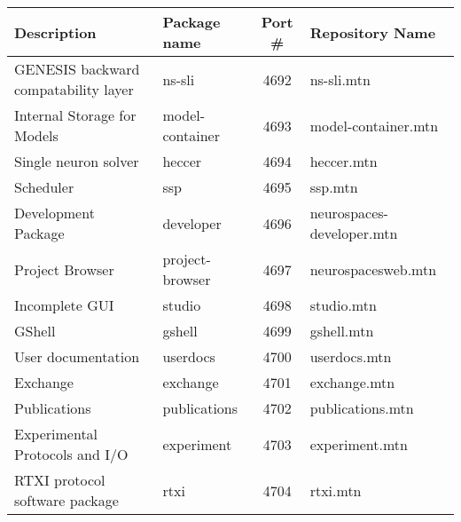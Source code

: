 \documentclass[12pt]{article}
\begin{document}
\vspace{3mm}
\begin{footnotesize}
\begin{centering}
\begin{tabular}{| l | l | c | l |}
\hline
{\bf Description}                                               & {\bf Package name}   & {\bf Port \#} & {\bf Repository Name} \\ \hline
GENESIS backward compatability layer    & ns-sli                             & 4692           & ns-sli.mtn \\ \hline
Internal Storage for Models                           & model-container        & 4693           & model-container.mtn \\ \hline
Single neuron solver                                      & heccer 	                        & 4694           & heccer.mtn \\ \hline
Scheduler                                                         & ssp                                & 4695           & ssp.mtn \\ \hline
Development Package                                  & developer                    & 4696           & neurospaces-developer.mtn \\ \hline
Project Browser                                               & project-browser          & 4697           & neurospacesweb.mtn \\ \hline
Incomplete GUI 	                                      & studio                            & 4698           & studio.mtn \\ \hline
GShell 	                                                         & gshell                            & 4699          & gshell.mtn \\ \hline
User documentation                                       & userdocs                      & 4700          & userdocs.mtn \\ \hline
Exchange                                       & exchange                      & 4701          & exchange.mtn \\ \hline
Publications                                       & publications                      & 4702          & publications.mtn \\ \hline
Experimental Protocols and I/O & experiment & 4703 & experiment.mtn \\ \hline
RTXI protocol software package & rtxi & 4704 & rtxi.mtn \\ \hline
\end{tabular}
\end{centering}
\end{footnotesize}
\end{document}
